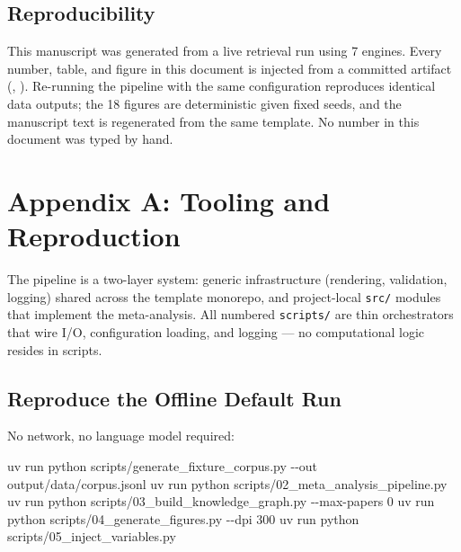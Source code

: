 \documentclass[
  english,
]{article}
\newenvironment{Shaded}{}{}
\newcommand{\AttributeTok}[1]{\textcolor[rgb]{0.49,0.56,0.16}{#1}}
\newcommand{\ExtensionTok}[1]{#1}
\newcommand{\NormalTok}[1]{#1}
\begin{document}
\subsection{Reproducibility}\label{reproducibility}

This manuscript was generated from a live retrieval run using 7 engines.
Every number, table, and figure in this document is injected from a
committed artifact (,
). Re-running the pipeline with the same
configuration reproduces identical data outputs; the 18 figures are
deterministic given fixed seeds, and the manuscript text is regenerated
from the same template. No number in this document was typed by hand.

\newpage

\section{Appendix A: Tooling and
Reproduction}\label{appendix-a-tooling-and-reproduction}

The pipeline is a two-layer system: generic infrastructure (rendering,
validation, logging) shared across the template monorepo, and
project-local \texttt{src/} modules that implement the meta-analysis.
All numbered \texttt{scripts/} are thin orchestrators that wire I/O,
configuration loading, and logging --- no computational logic resides in
scripts.

\subsection{Reproduce the Offline Default
Run}\label{reproduce-the-offline-default-run}

No network, no language model required:

\begin{Shaded}
\begin{Highlighting}[]
\ExtensionTok{uv}\NormalTok{ run python scripts/generate\_fixture\_corpus.py }\AttributeTok{{-}{-}out}\NormalTok{ output/data/corpus.jsonl}
\ExtensionTok{uv}\NormalTok{ run python scripts/02\_meta\_analysis\_pipeline.py}
\ExtensionTok{uv}\NormalTok{ run python scripts/03\_build\_knowledge\_graph.py }\AttributeTok{{-}{-}max{-}papers}\NormalTok{ 0}
\ExtensionTok{uv}\NormalTok{ run python scripts/04\_generate\_figures.py }\AttributeTok{{-}{-}dpi}\NormalTok{ 300}
\ExtensionTok{uv}\NormalTok{ run python scripts/05\_inject\_variables.py}
\end{Highlighting}
\end{Shaded}
\end{document}

